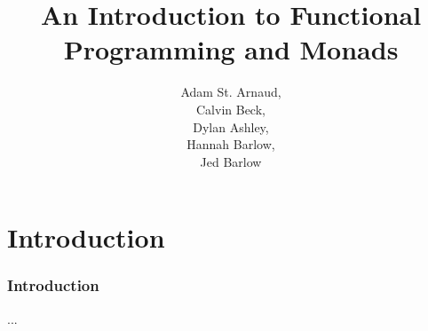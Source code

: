 \documentclass[]{beamer}
\title{An Introduction to Functional Programming and Monads}
\author{Adam St. Arnaud,\\Calvin Beck,\\Dylan Ashley,\\Hannah Barlow,\\Jed Barlow}
\begin{document}
\begin{frame}
\maketitle
\end{frame}

\section{Introduction}
\begin{frame}
    \frametitle{Introduction}
    ...
\end{frame}
\end{document}
